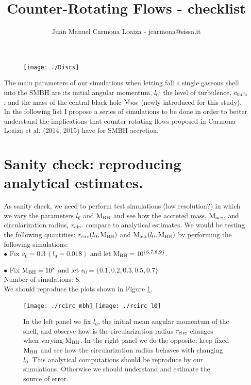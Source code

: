 \documentclass[11pt]{article} %
\title{Counter-Rotating Flows - checklist}
\author{Juan Manuel Carmona Loaiza - jcarmona@sissa.it}
\def\mbh{{\rm M_{\rm BH}}}
\def\macc{{\rm M_{\rm acc}}}
\def\rcirc{r_{\rm rirc}}
\begin{document}
\maketitle
\begin{figure}[H]
\texttt{[image: ./Discs]}
\end{figure}

\vspace{1cm}

The main parameters of our simulations when letting fall a single gaseous shell into the SMBH are its initial angular momentum, $l_0$; the level of turbulence, $v_{\rm turb}$; and the mass of the central black hole $\mbh$ (newly introduced for this study). In the following list I propose a series of simulations to be done in order to better understand the implications that counter-rotating flows proposed in Carmona-Loaiza et al. (2014, 2015) have for SMBH accretion.

\section{Sanity check: reproducing analytical estimates.}

As sanity check, we need to perform test simulations (low resolution?) in which we vary the parameters $l_0$ and $\mbh$ and see how the accreted mass, $\macc$, and circularization radius, $r_{\rm circ}$ compare to analytical estimates. We would be testing the following quantities: $\rcirc(l_0,\mbh)$ and $\macc(l_0,\mbh)$ by performing the following simulations:\\


$\bullet$ Fix $v_0 = 0.3 \, (l_0 = 0.018)$ and let $\mbh = 10^{\{6,7,8,9\}}$.

$\bullet$ Fix $\mbh = 10^8$ and let $v_0 = \{0.1, 0.2, 0.3, 0.5, 0.7\}$\\

Number of simulations: $8$.\\

\noindent We should reproduce the plots shown in Figure \ref{fig: rcirc}.\\

\begin{figure}
\texttt{[image: ./rcirc\_mbh]}
\texttt{[image: ./rcirc\_l0]}
\caption{In the left panel we fix $l_{0}$, the initial mean angular momentum of the shell, and observe how is the rircularization radius $\rcirc$ changes when varying $\mbh$. In the right panel we do the opposite: keep fixed $\mbh$ and see how the circularization radius behaves with changing $l_0$. This analytical computations should be reproduce by our simulations. Otherwise we should understand and estimate the source of error.}
\label{fig: rcirc}

\end{figure}
\end{document}

